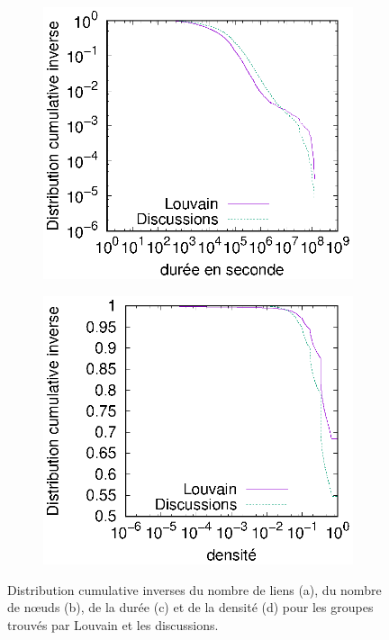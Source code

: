\begin{figure}[h]
	\begin{subfigure}{0.4\textwidth}
		\includegraphics[width=\linewidth]{img/mailing/Detection/duree}\hfill
		\caption{}		
	\end{subfigure}
	\begin{subfigure}{0.4\textwidth}
		\includegraphics[width=\linewidth]{img/mailing/Detection/densite}
		\caption{\label{fig:dens_mail_louvain}}		
	\end{subfigure}
\caption{Distribution cumulative inverses du nombre de liens (a), du nombre de n\oe uds (b), de la durée (c) et de la densité (d) pour les groupes trouvés par Louvain et les discussions.}
\label{fig:carac_mail_louvain}
\end{figure}



